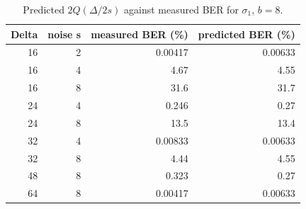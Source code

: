 \begin{table}[htbp]
\caption{Predicted $2Q(\Delta/2s)$ against measured BER for $\sigma_1$, $b=8$.}
\label{tab:theory_noise}
\begin{tabular}{rrrr}
\toprule
Delta & noise s & measured BER (\%) & predicted BER (\%) \\
\midrule
16 & 2 & 0.00417 & 0.00633 \\
16 & 4 & 4.67 & 4.55 \\
16 & 8 & 31.6 & 31.7 \\
24 & 4 & 0.246 & 0.27 \\
24 & 8 & 13.5 & 13.4 \\
32 & 4 & 0.00833 & 0.00633 \\
32 & 8 & 4.44 & 4.55 \\
48 & 8 & 0.323 & 0.27 \\
64 & 8 & 0.00417 & 0.00633 \\
\bottomrule
\end{tabular}
\end{table}
